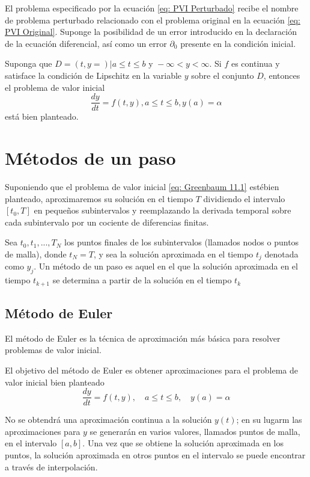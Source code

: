 El problema especificado por la ecuación \ref{eq: PVI Perturbado} recibe el nombre de problema perturbado relacionado con el problema original en la ecuación \ref{eq: PVI Original}. Suponge la posibilidad de un error introducido en la declaración de la ecuación diferencial, así como un error $\partial_0$ presente en la condición inicial.

\begin{theorem}
    Suponga que $D = {(t, y=) | a \leq t \leq b \text{ y } -\infty < y < \infty} $. Si $f$ es continua y satisface la condición de Lipschitz en la variable $y$ sobre el conjunto $D$, entonces el problema de valor inicial 
    \[ \frac{dy}{dt} = f(t,y), a \leq t \leq b, y(a) = \alpha\]
    está bien planteado.
\end{theorem}

\section{Métodos de un paso}

Suponiendo que el problema de valor inicial \ref{eq: Greenbaum 11.1} estébien planteado, aproximaremos su solución en el tiempo $T$ dividiendo el intervalo $[t_0, T]$ en pequeños subintervalos y reemplazando la derivada temporal sobre cada subintervalo por un cociente de diferencias finitas.

Sea $t_0, t_1, ..., T_N$ los puntos finales de los subintervalos (llamados nodos o puntos de malla), donde $t_N = T$, y sea la solución aproximada en el tiempo $t_j$ denotada como $y_j$. Un método de un paso es aquel en el que la solución aproximada en el tiempo $t_{k + 1}$ se determina a partir de la solución en el tiempo $t_k$
 
\subsection{Método de Euler}
El método de Euler es la técnica de aproximación más básica para resolver problemas de valor inicial.

El objetivo del método de Euler es obtener aproximaciones para el problema de valor inicial bien planteado
\begin{equation}
    \label{eq: PVI Bien Planteado}
    \frac{dy}{dt} = f(t,y), \quad a \leq t \leq b, \quad y(a) = \alpha
\end{equation}

No se obtendrá una aproximación continua a la solución $y(t)$; en su lugarm las aproximaciones para $y$ se generarán en varios valores, llamados puntos de malla, en el intervalo $[a, b]$. Una vez que se obtiene la solución aproximada en los puntos, la solución aproximada en otros puntos en el intervalo se puede encontrar a través de interpolación.

